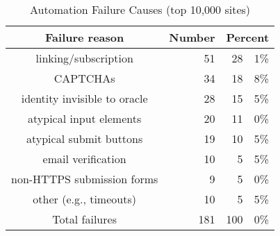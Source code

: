 
 \begin{table}[t]
 \begin{center}
 \begin{threeparttable}
 \begin{tabular}{|c|r|r@{.}l|}
 \hline
 \textbf{Failure reason} & \multicolumn{1}{|c|}{\textbf{Number}} & \multicolumn{2}{|c|}{\textbf{Percent}}\\
 \hline
 linking/subscription& 51 & 28 & 1\%\\
 \hline
 CAPTCHAs & 34 & 18 & 8\%\\
 \hline
 identity invisible to oracle & 28 & 15 & 5\%\\
 \hline
 atypical input elements & 20 & 11 & 0\%\\
 \hline
 atypical submit buttons & 19 & 10 & 5\%\\
 \hline
 email verification & 10 & 5 & 5\%\\
 \hline
 non-HTTPS submission forms & 9 & 5 & 0\%\\
 \hline
 other (e.g., timeouts) & 10 & 5 & 5\%\\
 \hline\hline
 Total failures & 181 & 100 &0\%\\
 \hline
 \end{tabular}
 \end{threeparttable}
 \end{center}
 \caption{Automation Failure Causes (top 10,000 sites)}
 \label{tab:ssoscan_study_failureReasons}
 \end{table}
